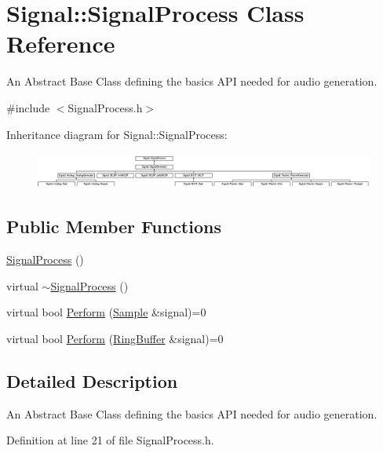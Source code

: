 \hypertarget{classSignal_1_1SignalProcess}{\section{Signal\+:\+:Signal\+Process Class Reference}
\label{classSignal_1_1SignalProcess}
}


An Abstract Base Class defining the basics A\+P\+I needed for audio generation.  




{\ttfamily \#include $<$Signal\+Process.\+h$>$}

Inheritance diagram for Signal\+:\+:Signal\+Process\+:\begin{figure}[H]
\begin{center}
\leavevmode
\includegraphics[height=1.196581cm]{classSignal_1_1SignalProcess}
\end{center}
\end{figure}
\subsection*{Public Member Functions}
\begin{DoxyCompactItemize}
\item 
\hyperlink{classSignal_1_1SignalProcess_ae64465136ef75a23053d5fc178de37f1}{Signal\+Process} ()
\item 
virtual \hyperlink{classSignal_1_1SignalProcess_a0c02bada1a551dd15aa76d9651338a6b}{$\sim$\+Signal\+Process} ()
\item 
virtual bool \hyperlink{classSignal_1_1SignalProcess_a7986df989ac8afca3674ae8eace3cfdb}{Perform} (\hyperlink{classSignal_1_1Sample}{Sample} \&signal)=0
\item 
virtual bool \hyperlink{classSignal_1_1SignalProcess_a9584dc515d2167f4439ed3d014bbb3f7}{Perform} (\hyperlink{classSignal_1_1RingBuffer}{Ring\+Buffer} \&signal)=0
\end{DoxyCompactItemize}


\subsection{Detailed Description}
An Abstract Base Class defining the basics A\+P\+I needed for audio generation. 

Definition at line 21 of file Signal\+Process.\+h.



